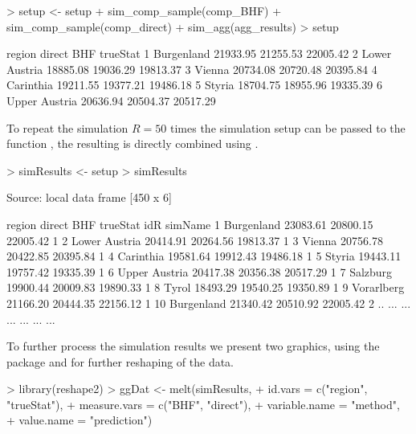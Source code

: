 \documentclass[article]{ajs}
\begin{document}
\begin{Schunk}
\begin{Sinput}
> setup <- setup %
+   sim_comp_sample(comp_BHF) %
+   sim_comp_sample(comp_direct) %
+   sim_agg(agg_results)
> setup
\end{Sinput}
\begin{Soutput}
         region   direct      BHF trueStat
1    Burgenland 21933.95 21255.53 22005.42
2 Lower Austria 18885.08 19036.29 19813.37
3        Vienna 20734.08 20720.48 20395.84
4     Carinthia 19211.55 19377.21 19486.18
5        Styria 18704.75 18955.96 19335.39
6 Upper Austria 20636.94 20504.37 20517.29
\end{Soutput}
\end{Schunk}

To repeat the simulation $R = 50$ times the simulation setup can be passed to the function , the resulting  is directly combined using .

\begin{Schunk}
\begin{Sinput}
> simResults <- setup %
> simResults
\end{Sinput}
\begin{Soutput}
Source: local data frame [450 x 6]

          region   direct      BHF trueStat idR simName
1     Burgenland 23083.61 20800.15 22005.42   1        
2  Lower Austria 20414.91 20264.56 19813.37   1        
3         Vienna 20756.78 20422.85 20395.84   1        
4      Carinthia 19581.64 19912.43 19486.18   1        
5         Styria 19443.11 19757.42 19335.39   1        
6  Upper Austria 20417.38 20356.38 20517.29   1        
7       Salzburg 19900.44 20009.83 19890.33   1        
8          Tyrol 18493.29 19540.25 19350.89   1        
9     Vorarlberg 21166.20 20444.35 22156.12   1        
10    Burgenland 21340.42 20510.92 22005.42   2        
..           ...      ...      ...      ... ...     ...
\end{Soutput}
\end{Schunk}

To further process the simulation results we present two graphics, using the package  \citep{wickham09} and  \citep{wickham07} for further reshaping of the data. 

\begin{Schunk}
\begin{Sinput}
> library(reshape2)
> ggDat <- melt(simResults,
+               id.vars = c("region", "trueStat"), 
+               measure.vars = c("BHF", "direct"), 
+               variable.name = "method",
+               value.name = "prediction")
\end{Sinput}
\end{Schunk}
\end{document}
